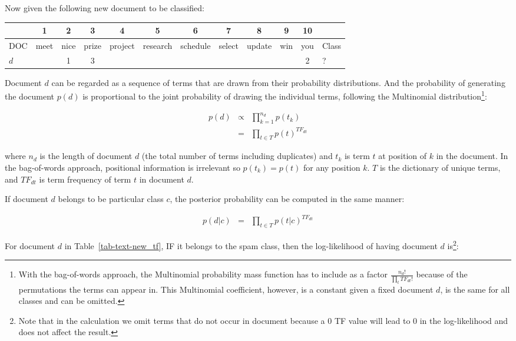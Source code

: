 \documentclass[
  letterpaper,
]{scrbook}
\newcounter{none} %
\begin{document}
Now given the following new document to be classified:

{\def\LTcaptype{none} %
\begin{longtable}[]{@{}lccccccccccl@{}}
\toprule\noalign{}
& 1 & 2 & 3 & 4 & 5 & 6 & 7 & 8 & 9 & 10 & \\
\midrule\noalign{}
\endhead
\bottomrule\noalign{}
\endlastfoot
DOC & meet & nice & prize & project & research & schedule & select &
update & win & you & Class \\
\(d\) & & 1 & 3 & & & & & & & 2 & ? \\
\end{longtable}
}

\protect{}\label{tab-text-new_tf}{}

Document \(d\) can be regarded as a sequence of terms that are drawn
from their probability distributions. And the probability of generating
the document \(p(d)\) is proportional to the joint probability of
drawing the individual terms, following the Multinomial
distribution\footnote{With the bag-of-words approach, the Multinomial
  probability mass function has to include as a factor
  \(\frac{n_d!}{\prod_t TF_{dt}!}\) because of the permutations the
  terms can appear in. This Multinomial coefficient, however, is a
  constant given a fixed document \(d\), is the same for all classes and
  can be omitted.}:

\[\begin{aligned}
  p(d)
  & \propto & \prod_{k=1}^{n_d} p(t_k) \\
  & = & \prod_{t \in T} p(t)^{TF_{dt}}
\end{aligned}\]

where \(n_d\) is the length of document \(d\) (the total number of terms
including duplicates) and \(t_k\) is term \(t\) at position of \(k\) in
the document. In the bag-of-words approach, positional information is
irrelevant so \(p(t_k) = p(t)\) for any position \(k\). \(T\) is the
dictionary of unique terms, and \(TF_{dt}\) is term frequency of term
\(t\) in document \(d\).

If document \(d\) belongs to be particular class \(c\), the posterior
probability can be computed in the same manner:

\[\begin{aligned}
  p(d|c)
  & = & \prod_{t \in T} p(t|c)^{TF_{dt}}
\end{aligned}\]

For document \(d\) in
Table~\hyperref[tab-text-new_tf]{{[}tab-text-new\_tf{]}}, IF it belongs
to the spam class, then the log-likelihood of having document \(d\)
is\footnote{Note that in the calculation we omit terms that do not occur
  in document because a \(0\) TF value will lead to \(0\) in the
  log-likelihood and does not affect the result.}:
\end{document}
